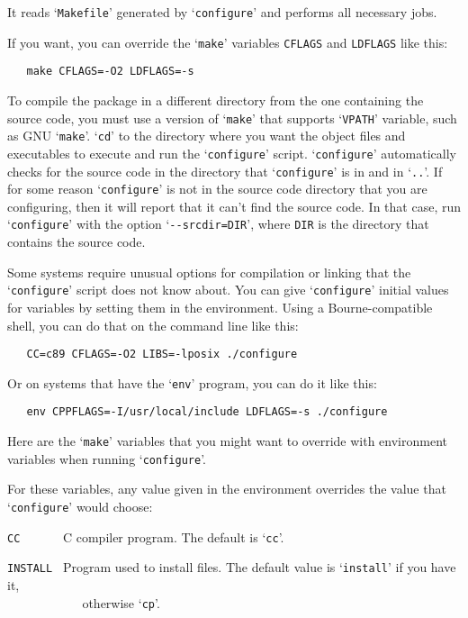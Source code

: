 \noindent
It reads `\verb|Makefile|' generated by `\verb|configure|' and performs
all necessary jobs.

If you want, you can override the `\verb|make|' variables \verb|CFLAGS|
and \verb|LDFLAGS| like this:

\begin{verbatim}
   make CFLAGS=-O2 LDFLAGS=-s
\end{verbatim}

To compile the package in a different directory from the one containing
the source code, you must use a version of `\verb|make|' that supports
`\verb|VPATH|' variable, such as GNU `\verb|make|'. `\verb|cd|' to the
directory where you want the object files and executables to execute and run
the `\verb|configure|' script. `\verb|configure|' automatically checks
for the source code in the directory that `\verb|configure|' is in and
in `\verb|..|'. If for some reason `\verb|configure|' is not in the
source code directory that you are configuring, then it will report
that it can't find the source code. In that case, run `\verb|configure|'
with the option `\verb|--srcdir=DIR|', where \verb|DIR| is the
directory that contains the source code.

Some systems require unusual options for compilation or linking that
the `\verb|configure|' script does not know about. You can give
`\verb|configure|' initial values for variables by setting them in the
environment. Using a Bourne-compatible shell, you can do that on the
command line like this:

\begin{verbatim}
   CC=c89 CFLAGS=-O2 LIBS=-lposix ./configure
\end{verbatim}

\noindent
Or on systems that have the `\verb|env|' program, you can do it like
this:

\begin{verbatim}
   env CPPFLAGS=-I/usr/local/include LDFLAGS=-s ./configure
\end{verbatim}

Here are the `\verb|make|' variables that you might want to override
with environment variables when running `\verb|configure|'.

For these variables, any value given in the environment overrides the
value that `\verb|configure|' would choose:

\verb|CC      | C compiler program. The default is `\verb|cc|'.

\verb|INSTALL | Program used to install files. The default value is
`\verb|install|' if you have it,\\
\verb|           | otherwise `\verb|cp|'.

